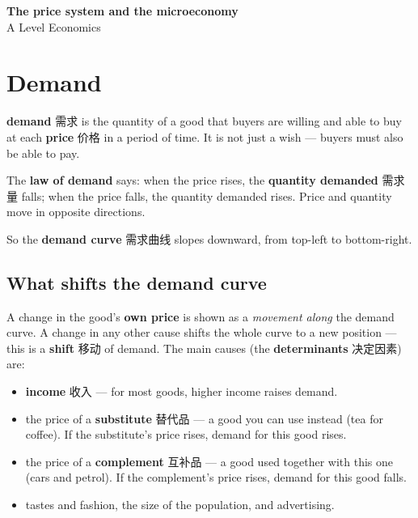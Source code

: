 \documentclass[11pt]{article}
\begin{document}
\begin{center}
  {\LARGE\bfseries The price system and the microeconomy}\\[0.35em]
  {\large A Level Economics}
\end{center}
\vspace{0.6em}

\section*{Demand}

\textbf{demand} 需求 is the quantity of a good that buyers are willing and able to buy at each \textbf{price} 价格 in a period of time. It is not just a wish — buyers must also be able to pay.

The \textbf{law of demand} says: when the price rises, the \textbf{quantity demanded} 需求量 falls; when the price falls, the quantity demanded rises. Price and quantity move in opposite directions.

So the \textbf{demand curve} 需求曲线 slopes downward, from top-left to bottom-right.

\subsection*{What shifts the demand curve}

A change in the good's \textbf{own price} is shown as a \emph{movement along} the demand curve. A change in any other cause shifts the whole curve to a new position — this is a \textbf{shift} 移动 of demand. The main causes (the \textbf{determinants} 决定因素) are:

\begin{itemize}
\item \textbf{income} 收入 — for most goods, higher income raises demand.

\item the price of a \textbf{substitute} 替代品 — a good you can use instead (tea for coffee). If the substitute's price rises, demand for this good rises.

\item the price of a \textbf{complement} 互补品 — a good used together with this one (cars and petrol). If the complement's price rises, demand for this good falls.

\item tastes and fashion, the size of the population, and advertising.

\end{itemize}
\end{document}
